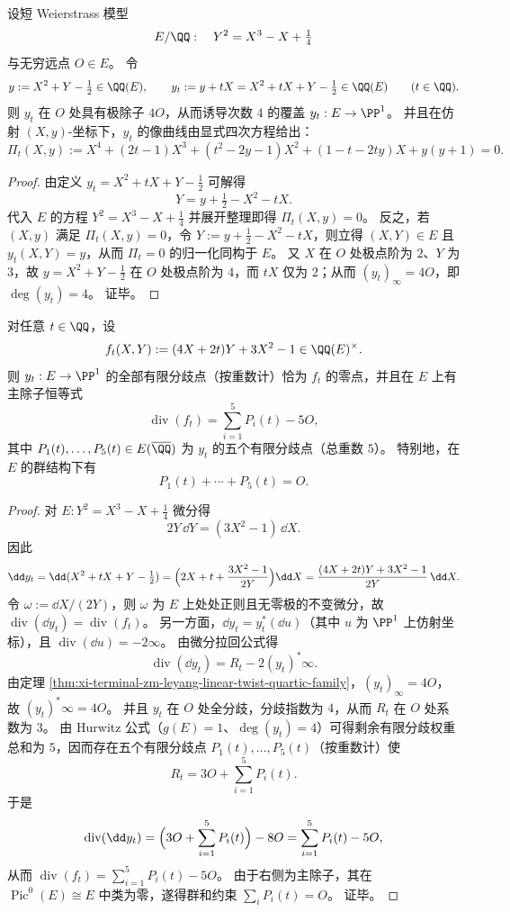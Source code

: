 \begin{theorem}\label{thm:xi-terminal-zm-leyang-linear-twist-quartic-family}
设短 Weierstrass 模型
\[
E/\QQ:\quad Y^2=X^3-X+\tfrac14
\]
与无穷远点 \(O\in E\)。
令
\[
y:=X^2+Y-\tfrac12\in \QQ(E),
\qquad
y_t:=y+tX=X^2+tX+Y-\tfrac12\in \QQ(E)\qquad (t\in\QQ).
\]
则 \(y_t\) 在 \(O\) 处具有极除子 \(4O\)，从而诱导次数 \(4\) 的覆盖 \(y_t:E\to\PP^1\)。
并且在仿射 \((X,y)\)-坐标下，\(y_t\) 的像曲线由显式四次方程给出：
\[
\Pi_t(X,y):=X^4+(2t-1)X^3+(t^2-2y-1)X^2+(1-t-2ty)X+y(y+1)=0.
\]
\end{theorem}
\begin{proof}
由定义 \(y_t=X^2+tX+Y-\tfrac12\) 可解得
\[
Y=y+\tfrac12-X^2-tX.
\]
代入 \(E\) 的方程 \(Y^2=X^3-X+\tfrac14\) 并展开整理即得 \(\Pi_t(X,y)=0\)。
反之，若 \((X,y)\) 满足 \(\Pi_t(X,y)=0\)，令 \(Y:=y+\tfrac12-X^2-tX\)，则立得 \((X,Y)\in E\) 且 \(y_t(X,Y)=y\)，从而 \(\Pi_t=0\) 的归一化同构于 \(E\)。
又 \(X\) 在 \(O\) 处极点阶为 \(2\)、\(Y\) 为 \(3\)，故 \(y=X^2+Y-\tfrac12\) 在 \(O\) 处极点阶为 \(4\)，而 \(tX\) 仅为 \(2\)；从而 \((y_t)_\infty=4O\)，即 \(\deg(y_t)=4\)。
证毕。
\end{proof}

\begin{proposition}[有限分歧除子的显式生成元与群和约束]\label{prop:xi-terminal-zm-leyang-linear-twist-ramification-divisor}
对任意 \(t\in\QQ\)，设
\[
f_t(X,Y):=(4X+2t)Y+3X^2-1\in \QQ(E)^\times.
\]
则 \(y_t:E\to\PP^1\) 的全部有限分歧点（按重数计）恰为 \(f_t\) 的零点，并且在 \(E\) 上有主除子恒等式
\[
\operatorname{div}(f_t)=\sum_{i=1}^5 P_i(t)-5O,
\]
其中 \(P_1(t),\dots,P_5(t)\in E(\overline{\QQ})\) 为 \(y_t\) 的五个有限分歧点（总重数 \(5\)）。
特别地，在 \(E\) 的群结构下有
\[
P_1(t)+\cdots+P_5(t)=O.
\]
\end{proposition}
\begin{proof}
对 \(E:Y^2=X^3-X+\tfrac14\) 微分得
\[
2Y\,\dd Y=(3X^2-1)\,\dd X.
\]
因此
\[
\dd y_t=\dd(X^2+tX+Y-\tfrac12)
=\Bigl(2X+t+\frac{3X^2-1}{2Y}\Bigr)\dd X
=\frac{(4X+2t)Y+3X^2-1}{2Y}\,\dd X.
\]
令 \(\omega:=\dd X/(2Y)\)，则 \(\omega\) 为 \(E\) 上处处正则且无零极的不变微分，故
\(
\operatorname{div}(\dd y_t)=\operatorname{div}(f_t)
\)。
另一方面，\(\dd y_t=y_t^*(\dd u)\)（其中 \(u\) 为 \(\PP^1\) 上仿射坐标），且 \(\operatorname{div}(\dd u)=-2\infty\)。
由微分拉回公式得
\[
\operatorname{div}(\dd y_t)=R_t-2(y_t)^*\infty.
\]
由定理 \ref{thm:xi-terminal-zm-leyang-linear-twist-quartic-family}，\((y_t)_\infty=4O\)，故 \((y_t)^*\infty=4O\)。
并且 \(y_t\) 在 \(O\) 处全分歧，分歧指数为 \(4\)，从而 \(R_t\) 在 \(O\) 处系数为 \(3\)。
由 Hurwitz 公式（\(g(E)=1\)、\(\deg(y_t)=4\)）可得剩余有限分歧权重总和为 \(5\)，因而存在五个有限分歧点 \(P_1(t),\dots,P_5(t)\)（按重数计）使
\[
R_t=3O+\sum_{i=1}^5 P_i(t).
\]
于是
\[
\operatorname{div}(\dd y_t)=\Bigl(3O+\sum_{i=1}^5 P_i(t)\Bigr)-8O=\sum_{i=1}^5 P_i(t)-5O,
\]
从而 \(\operatorname{div}(f_t)=\sum_{i=1}^5 P_i(t)-5O\)。
由于右侧为主除子，其在 \(\operatorname{Pic}^0(E)\cong E\) 中类为零，遂得群和约束 \(\sum_i P_i(t)=O\)。
证毕。
\end{proof}

